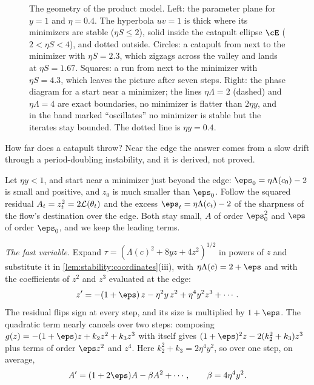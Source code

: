 \begin{refsection}
\begin{figure}[t]
\begin{fullwidth}
\end{fullwidth}
\caption{The geometry of the product model. Left: the parameter plane for $y=1$ and $\eta=0.4$. The hyperbola $uv=1$ is thick where its minimizers are stable ($\eta S\le2$), solid inside the catapult ellipse $\cE$ ($2<\eta S<4$), and dotted outside. Circles: a catapult from next to the minimizer with $\eta S=2.3$, which zigzags across the valley and lands at $\eta S=1.67$. Squares: a run from next to the minimizer with $\eta S=4.3$, which leaves the picture after seven steps. Right: the phase diagram for a start near a minimizer; the lines $\eta\Lambda=2$ (dashed) and $\eta\Lambda=4$ are exact boundaries, no minimizer is flatter than $2\eta y$, and in the band marked ``oscillates'' no minimizer is stable but the iterates stay bounded. The dotted line is $\eta y=0.4$.}
\label{fig:stability:ellipse}
\end{figure}

How far does a catapult throw? Near the edge the answer comes from a slow drift through a period-doubling instability, and it is derived, not proved.

\begin{heuristic}
Let $\eta y<1$, and start near a minimizer just beyond the edge: $\eps_0=\eta\Lambda(c_0)-2$ is small and positive, and $z_0$ is much smaller than $\eps_0$. Follow the squared residual $A_t=z_t^2=2\mathcal{L}(\theta_t)$ and the excess $\eps_t=\eta\Lambda(c_t)-2$ of the sharpness of the flow's destination over the edge. Both stay small, $A$ of order $\eps_0^2$ and $\eps$ of order $\eps_0$, and we keep the leading terms.

\emph{The fast variable.} Expand $\tau=(\Lambda(c)^2+8yz+4z^2)^{1/2}$ in powers of $z$ and substitute it in \cref{lem:stability:coordinates}(iii), with $\eta\Lambda(c)=2+\eps$ and with the coefficients of $z^2$ and $z^3$ evaluated at the edge:
\[
  z'=-(1+\eps)\,z-\eta^2y\,z^2+\eta^4y^2z^3+\cdots .
\]
The residual flips sign at every step, and its size is multiplied by $1+\eps$. The quadratic term nearly cancels over two steps: composing $g(z)=-(1+\eps)z+k_2z^2+k_3z^3$ with itself gives $(1+\eps)^2z-2(k_2^2+k_3)z^3$ plus terms of order $\eps z^2$ and $z^4$. Here $k_2^2+k_3=2\eta^4y^2$, so over one step, on average,
\[
  A'=(1+2\eps)A-\beta A^2+\cdots,\qquad \beta=4\eta^4y^2 .
\]


\end{heuristic}
\end{refsection}
